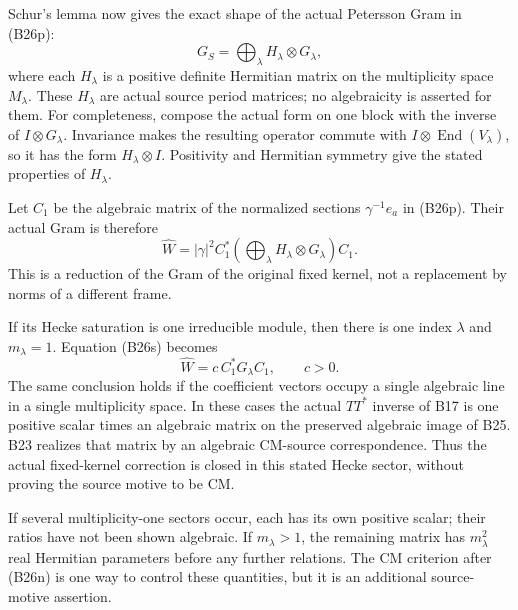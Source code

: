 \documentclass[11pt]{article}
\theoremstyle{definition}\newtheorem{definition}[theorem]{Definition}\newtheorem{remark}[theorem]{Remark}
\begin{document}
Schur's lemma now gives the exact shape of the actual
Petersson Gram in (B26p):
\[
                   G_S=\bigoplus_\lambda
                                  H_\lambda\otimes G_\lambda,
 \tag{B26r}
\]
where each $H_\lambda$ is a positive definite Hermitian
matrix on the multiplicity space $M_\lambda$.  These
$H_\lambda$ are actual source period matrices; no
algebraicity is asserted for them.  For completeness,
compose the actual form on one block with the inverse
of $I\otimes G_\lambda$.  Invariance makes the resulting
operator commute with $I\otimes\operatorname{End}(V_\lambda)$,
so it has the form $H_\lambda\otimes I$.  Positivity and
Hermitian symmetry give the stated properties of
$H_\lambda$.

Let $C_1$ be the algebraic matrix of the normalized
sections $\gamma^{-1}e_a$ in (B26p).  Their actual Gram
is therefore
\[
       \widehat W=|\gamma|^2 C_1^*
          \left(\bigoplus_\lambda H_\lambda\otimes G_\lambda\right)
                                  C_1.
 \tag{B26s}
\]
This is a reduction of the Gram of the original fixed
kernel, not a replacement by norms of a different frame.

If its Hecke saturation is one irreducible module, then
there is one index $\lambda$ and $m_\lambda=1$.
Equation (B26s) becomes
\[
                 \widehat W=c\,C_1^*G_\lambda C_1,
                         \qquad c>0.
 \tag{B26t}
\]
The same conclusion holds if the coefficient vectors
occupy a single algebraic line in a single multiplicity
space.  In these cases the actual $TT^*$ inverse of B17
is one positive scalar times an algebraic matrix on
the preserved algebraic image of B25.  B23 realizes that
matrix by an algebraic CM-source correspondence.  Thus
the actual fixed-kernel correction is closed in this
stated Hecke sector, without proving the source motive
to be CM.

If several multiplicity-one sectors occur, each has its
own positive scalar; their ratios have not been shown
algebraic.  If $m_\lambda>1$, the remaining matrix has
$m_\lambda^2$ real Hermitian parameters before any further
relations.  The CM criterion after (B26n) is one way to
control these quantities, but it is an additional
source-motive assertion.
\end{document}
